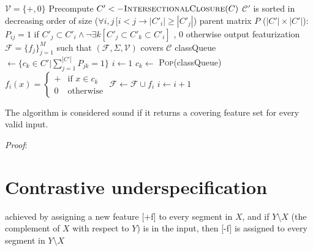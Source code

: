 \documentclass[11pt, oneside]{article}   	%
\begin{document}
\vspace{\baselineskip} \noindent \begin{algorithmic}
	\REQUIRE $\mathcal V = \{ +, 0 \}$
	\REQUIRE Precompute $C' <- \textsc{IntersectionalClosure}(C)$
	\REQUIRE $\mathcal C'$ is sorted in decreasing order of size ($\forall i, j \, [i < j \rightarrow |C'_i| \geq |C'_j|$)
	\REQUIRE parent matrix $P$ ($|C'| \times |C'|$): $P_{ij} = 1$ if $C'_j \subset C'_i \land \neg \exists k [C'_j \subset C'_k \subset C'_i]$ , $0$ otherwise
	\ENSURE output featurization $\mathcal F = \{ f_j \}_{j=1}^M$ such that $(\mathcal F, \Sigma, \mathcal V)$ covers $\mathcal C$
	\STATE
	\STATE classQueue $\leftarrow \{c_k \in C' | \sum_{j=1}^{|C'|}P_{jk} = 1 \}$
	\STATE $i \leftarrow 1$
	\STATE
	\STATE $c_k \leftarrow$ \textsc{Pop}(classQueue)
	\STATE $f_i(x) = \begin{cases}
		+ & \mbox{if } x \in c_k \\
		0 & \mbox{otherwise}
		\end{cases} $
	\STATE $\mathcal F \leftarrow \mathcal F \cup f_i$
	\STATE $i \leftarrow i + 1$
	\ENDWHILE
\end{algorithmic}

\vspace{\baselineskip} The algorithm is considered sound if it returns a covering feature set for every valid input. 

\textit{Proof}:




\section{Contrastive underspecification}
achieved by assigning a new feature [+f] to every segment in $X$, and if $Y \setminus X$ (the complement of $X$ with respect to $Y$) is in the input, then [-f] is assigned to every segment in $Y \setminus X$
\end{document}
